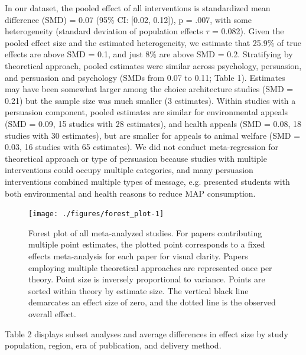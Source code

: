 \documentclass[sn-nature,referee,pdflatex]{sn-jnl}
\begin{document}
In our dataset, the pooled effect of all interventions is standardized
mean difference (SMD) = 0.07 (95\% CI: {[}0.02, 0.12{]}), p = .007, with
some heterogeneity (standard deviation of population effects \(\tau\) =
0.082). Given the pooled effect size and the estimated heterogeneity, we
estimate that 25.9\% of true effects are above SMD = 0.1, and just 8\%
are above SMD = 0.2. Stratifying by theoretical approach, pooled
estimates were similar across psychology, persuasion, and persuasion and
psychology (SMDs from 0.07 to 0.11; Table 1). Estimates may have been
somewhat larger among the choice architecture studies (SMD = 0.21) but
the sample size was much smaller (3 estimates). Within studies with a
persuasion component, pooled estimates are similar for environmental
appeals (SMD = 0.09, 15 studies with 28 estimates), and health appeals
(SMD = 0.08, 18 studies with 30 estimates), but are smaller for appeals
to animal welfare (SMD = 0.03, 16 studies with 65 estimates). We did not
conduct meta-regression for theoretical approach or type of persuasion
because studies with multiple interventions could occupy multiple
categories, and many persuasion interventions combined multiple types of
message, e.g. \citep{jalil2023} presented students with both
environmental and health reasons to reduce MAP consumption.

\begin{figure}[H]

{\centering \texttt{[image: ./figures/forest\_plot-1]} 

}

\caption{Forest plot of all meta-analyzed studies. For papers contributing multiple point estimates, the plotted point corresponds to a fixed effects meta-analysis for each paper for visual clarity. Papers employing multiple theoretical approaches are represented once per theory. Point size is inversely proportional to variance. Points are sorted within theory by estimate size. The vertical black line demarcates an effect size of zero, and the dotted line is the observed overall effect.}\label{fig:forest_plot}
\end{figure}

Table 2 displays subset analyses and average differences in effect size
by study population, region, era of publication, and delivery method.
\end{document}
